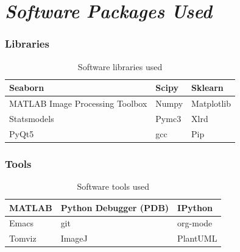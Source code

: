 \documentclass[11pt]{report}
\begin{document}
\appendix
\chapter{\emph{Software Packages Used}}
\label{sec:orge45bc80}
\subsection{Libraries}
\label{sec:org40142d1}
\begin{table}[htbp]
\caption{\label{tab:org31f28d8}
Software libraries used}
\centering
\begin{tabularx}{\textwidth}{|X|X|X|}
\hline
Seaborn & Scipy & Sklearn\\
\hline
MATLAB Image Processing Toolbox & Numpy & Matplotlib\\
\hline
Statsmodels & Pymc3 & Xlrd\\
\hline
PyQt5 & gcc & Pip\\
\hline
\end{tabularx}
\end{table}

\subsection{Tools}
\label{sec:org2852d5a}
\begin{table}[htbp]
\caption{\label{tab:org4c21b51}
Software tools used}
\centering
\begin{tabularx}{\textwidth}{|X|X|X|}
\hline
MATLAB & Python Debugger (PDB) & IPython\\
\hline
Emacs & git & org-mode\\
\hline
Tomviz & ImageJ & PlantUML\\
\hline
\end{tabularx}
\end{table}

\clearpage
\end{document}
